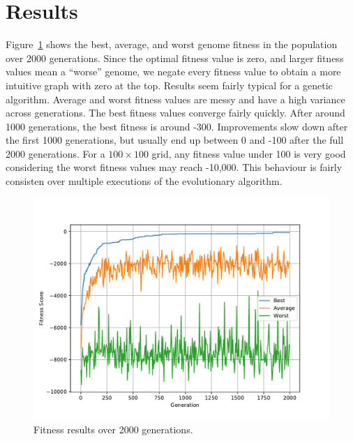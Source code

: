 
\section{Results}

Figure~\ref{fig:results} shows the best, average, and worst genome fitness in the population over 2000 generations. Since the optimal fitness value is zero, and larger fitness values mean a ``worse'' genome, we negate every fitness value to obtain a more intuitive graph with zero at the top. Results seem fairly typical for a genetic algorithm. Average and worst fitness values are messy and have a high variance across generations. The best fitness values converge fairly quickly. After around 1000 generations, the best fitness is around -300. Improvements slow down after the first 1000 generations, but usually end up between 0 and -100 after the full 2000 generations. For a $100 \times 100$ grid, any fitness value under 100 is very good considering the worst fitness values may reach -10,000. This behaviour is fairly consisten over multiple executions of the evolutionary algorithm.

\begin{figure}[h]
    \centering
    \includegraphics[scale=0.75]{figures/results.pdf}
    \caption{ \small Fitness results over 2000 generations.}
    \label{fig:results}
\end{figure}
